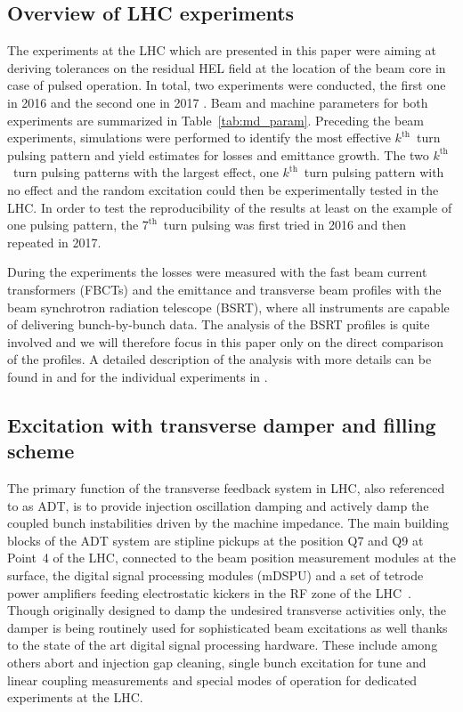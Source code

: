 \documentclass[%
 reprint,
 amsmath,amssymb,
 aps,
prstab,
longbibliography,
]{revtex4-1}
\begin{document}
\subsection{Overview of LHC experiments\label{sec:exp_sum}}
The experiments at the LHC which are presented in this paper were aiming at deriving tolerances on the residual HEL field at the location of the beam core in case of pulsed operation. In total, two experiments were conducted, the first one in 2016 \cite{resexmd2016} and the second one in 2017 \cite{resexmd2017}. Beam and machine parameters for both experiments are summarized in Table~\ref{tab:md_param}. Preceding the beam experiments, simulations were performed to identify the most effective $k^{\mathrm{th}}$~turn pulsing pattern and yield estimates for losses and emittance growth. The two $k^{\mathrm{th}}$~turn pulsing patterns with the largest effect, one $k^{\mathrm{th}}$~turn pulsing pattern with no effect and the random excitation could then be experimentally tested in the LHC. In order to test the reproducibility of the results at least on the example of one pulsing pattern, the $7^{\mathrm{th}}$~turn pulsing was first tried in 2016 and then repeated in 2017.

During the experiments the losses were measured with the fast beam current transformers (FBCTs) and the emittance and transverse beam profiles with the beam synchrotron radiation telescope (BSRT), where all instruments are capable of delivering bunch-by-bunch data. The analysis of the BSRT profiles is quite involved and we will therefore focus in this paper only on the direct comparison of the profiles. A detailed description of the analysis with more details can be found in \cite{bsrtprofinj} and for the individual experiments in \cite{resexmd2016,resexmd2017}.

\subsection{Excitation with transverse damper and filling scheme\label{sec:adt}}
The primary function of the transverse feedback system in LHC, also referenced to as ADT, is to provide injection oscillation damping and actively damp the coupled bunch instabilities driven by the machine impedance. The main building blocks of the ADT system are stipline pickups at the position Q7 and Q9 at Point~4 of the LHC, connected to the beam position measurement modules at the surface, the digital signal processing modules (mDSPU) and a set of tetrode power amplifiers feeding electrostatic kickers in the RF zone of the LHC~\cite{adt_sum_2008,adt_sum_2011}. Though originally designed to damp the undesired transverse activities only, the damper is being routinely used for sophisticated beam excitations as well thanks to the state of the art digital signal processing hardware. These include among others abort and injection gap cleaning, single bunch excitation for tune and linear coupling measurements and special modes of operation for dedicated experiments at the LHC.
\end{document}
